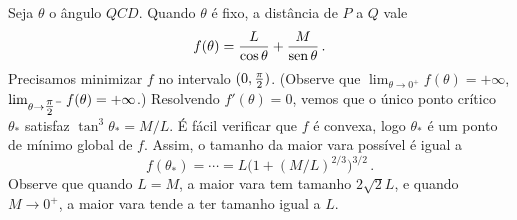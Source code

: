 \begin{exo}
\begin{sol}
\begin{center}
\begin{bmlimage}
\end{bmlimage}
\end{center}
Seja $\theta$ o ângulo $QCD$. Quando $\theta$ é fixo, a
distância de $P$ a $Q$ vale 
$$
f(\theta)=\frac{L}{\cos \theta}+\frac{M}{\operatorname{sen} \theta}\,.
$$
Precisamos minimizar $f$ no intervalo $(0,\tfrac{\pi}{2})$.
(Observe que $\lim_{\theta\to 0^+}f(\theta)=+\infty$,
$\lim_{\theta\to {\tfrac{\pi}{2}}^-}f(\theta)=+\infty$.)
Resolvendo $f'(\theta)=0$, vemos que o único ponto crítico
$\theta_*$ satisfaz $\tan^3\theta_*=M/L$. É fácil verificar
que $f$ é convexa, logo $\theta_*$ é um ponto de mínimo global
de $f$.
Assim, o tamanho da maior vara possível é igual a
$$
f(\theta_*)=\cdots=L\bigl(1+(M/L)^{2/3}\bigr)^{3/2}\,.
$$
Observe que quando $L=M$, a maior vara tem tamanho
$2\sqrt{2}L$, e quando $M\to 0^+$, a maior vara tende a ter
tamanho igual a $L$.
\end{sol}
\end{exo}

